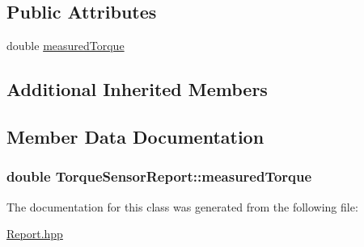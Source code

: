 \subsection*{Public Attributes}
\begin{DoxyCompactItemize}
\item 
double \hyperlink{classTorqueSensorReport_a37e7ca370c0d51977656be14c0653b96}{measured\+Torque}
\end{DoxyCompactItemize}
\subsection*{Additional Inherited Members}


\subsection{Member Data Documentation}
\subsubsection[{\texorpdfstring{measured\+Torque}{measuredTorque}}]{\setlength{\rightskip}{0pt plus 5cm}double Torque\+Sensor\+Report\+::measured\+Torque}\hypertarget{classTorqueSensorReport_a37e7ca370c0d51977656be14c0653b96}{}\label{classTorqueSensorReport_a37e7ca370c0d51977656be14c0653b96}


The documentation for this class was generated from the following file\+:\begin{DoxyCompactItemize}
\item 
\hyperlink{Report_8hpp}{Report.\+hpp}\end{DoxyCompactItemize}

